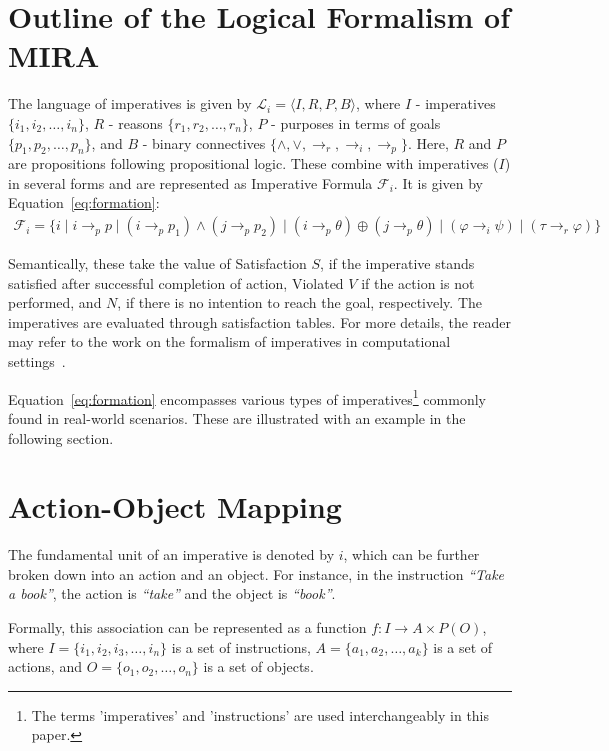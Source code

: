\documentclass[a4paper,11pt]{lmcs}
\begin{document}
\section{Outline of the Logical Formalism of MIRA}
\label{sec:mira}
The language of imperatives is given by \(\mathcal{L}_i = \langle I, R, P, B \rangle\), where \(I\) - imperatives \(\{ i_1, i_2, \ldots, i_n \}\), \(R\) - reasons \(\{ r_1, r_2, \ldots, r_n \}\), \(P\) - purposes in terms of goals \(\{ p_1, p_2, \ldots, p_n \}\), and \(B\) - binary connectives \(\{ \wedge, \vee, \rightarrow_r, \rightarrow_i, \rightarrow_p \}\). Here, \(R\) and \(P\) are propositions following propositional logic. These combine with imperatives (\(I\)) in several forms and are represented as Imperative Formula \(\mathcal{F}_i\). It is given by Equation~\ref{eq:formation}:
\begin{eqnarray}
\label{eq:formation}
\mathcal{F}_i = \{ i \mid i \rightarrow_p p \mid (i \rightarrow_p p_1) \wedge (j \rightarrow_p p_2) \mid (i \rightarrow_p \theta) \oplus (j \rightarrow_p \theta) \mid (\varphi \rightarrow_i \psi) \mid (\tau \rightarrow_r \varphi) \}
\end{eqnarray}

Semantically, these take the value of Satisfaction \(S\), if the imperative stands satisfied after successful completion of action, Violated \(V\) if the action is not performed, and \(N\), if there is no intention to reach the goal, respectively. The imperatives are evaluated through satisfaction tables. For more details, the reader may refer to the work on the formalism of imperatives in computational settings~\cite{mira}.

Equation~\ref{eq:formation} encompasses various types of imperatives\footnote{The terms 'imperatives' and 'instructions' are used interchangeably in this paper.} commonly found in real-world scenarios. These are illustrated with an example in the following section.

\section{Action-Object Mapping}
\label{sec:class}
The fundamental unit of an imperative is denoted by \(i\), which can be further broken down into an action and an object. For instance, in the instruction \textit{``Take a book''}, the action is \textit{``take''} and the object is \textit{``book''}.

Formally, this association can be represented as a function \(f: I \rightarrow A \times P(O)\), where \(I = \{i_1, i_2, i_3, \ldots, i_n\}\) is a set of instructions, \(A = \{a_1, a_2, \ldots, a_k\}\) is a set of actions, and \(O = \{o_1, o_2, \ldots, o_n\}\) is a set of objects.
\end{document}
